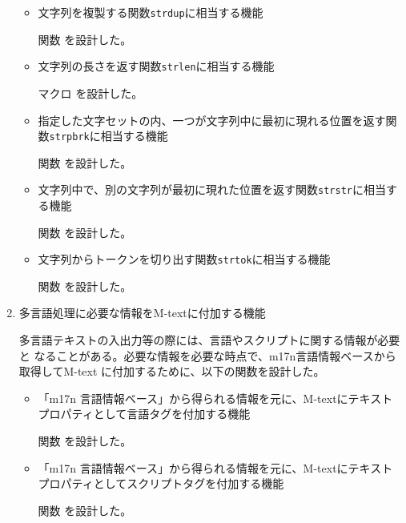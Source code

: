\begin{enumerate}
\begin{itemize}
     \item 文字列を複製する関数\texttt{strdup}に相当する機能\par 
       関数 を設計した。
     \item 文字列の長さを返す関数\texttt{strlen}に相当する機能\par 
       マクロ を設計した。
     \item 指定した文字セットの内、一つが文字列中に最初に現れる位置を返す関数\texttt{strpbrk}に相当する機能\par 
       関数 を設計した。
     \item 文字列中で、別の文字列が最初に現れた位置を返す関数\texttt{strstr}に相当する機能\par 
       関数 を設計した。
     \item 文字列からトークンを切り出す関数\texttt{strtok}に相当する機能\par 
       関数 を設計した。
     \end{itemize}
     
\item 多言語処理に必要な情報をM-textに付加する機能

多言語テキストの入出力等の際には、言語やスクリプトに関する情報が必要と
なることがある。必要な情報を必要な時点で、m17n言語情報ベースから取得してM-text 
に付加するために、以下の関数を設計した。

     \begin{itemize}
     \item 「m17n 言語情報ベース」から得られる情報を元に、M-textにテキストプロパティとして言語タグを付加する機能\par 
       関数 を設計した。 
     \item 「m17n 言語情報ベース」から得られる情報を元に、M-textにテキストプロパティとしてスクリプトタグを付加する機能\par 
	関数 を設計した。
     \end{itemize}
     
\end{enumerate}
